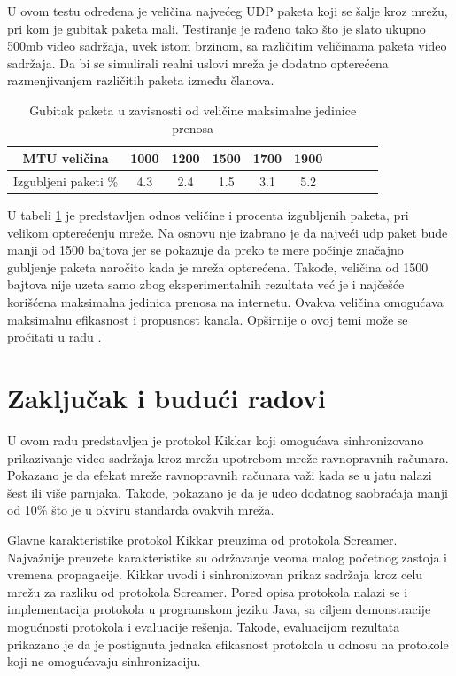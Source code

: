 \documentclass[12pt,oneside]{memoir}
\begin{document}
U ovom testu određena je veličina najvećeg UDP paketa koji se šalje kroz mrežu, pri kom je gubitak paketa mali. Testiranje je rađeno tako što je slato ukupno 500mb video sadržaja, uvek istom brzinom, sa različitim veličinama paketa video sadržaja. Da bi se simulirali realni uslovi mreža je dodatno opterećena razmenjivanjem različitih paketa između članova. 

\begin{table}[h]
\caption{Gubitak paketa u zavisnosti od veličine maksimalne jedinice prenosa} 
\label{tab:mtu}
\centering
\begin{tabular}{ |c|c|c|c|c|c|c|c|c|c| } 
\hline 
 MTU veličina & 1000 & 1200 & 1500 & 1700 & 1900\\
\hline
 Izgubljeni paketi \% & 4.3 & 2.4 & 1.5 & 3.1 & 5.2  \\
\hline
\end{tabular}
\end{table} 

U tabeli \ref{tab:mtu} je predstavljen odnos veličine i procenta izgubljenih paketa, pri velikom opterećenju mreže. Na osnovu nje izabrano je da najveći udp paket bude manji od 1500 bajtova jer se pokazuje da preko te mere počinje značajno gubljenje paketa naročito kada je mreža opterećena. Takođe, veličina od 1500 bajtova nije uzeta samo zbog eksperimentalnih rezultata već je i najčešće korišćena maksimalna jedinica prenosa na internetu. Ovakva veličina omogućava maksimalnu efikasnost i propusnost kanala. Opširnije o ovoj temi može se pročitati u radu \cite{Kodikara} .




\chapter{Zaključak i budući radovi}
\label{chp:zakljucak}

U ovom radu predstavljen je protokol Kikkar koji omogućava sinhronizovano prikazivanje video sadržaja kroz mrežu upotrebom mreže ravnopravnih računara. Pokazano je da efekat mreže ravnopravnih računara važi kada se u jatu nalazi šest ili više parnjaka. Takođe, pokazano je da je udeo dodatnog saobraćaja manji od 10\% što je u okviru standarda ovakvih mreža.
 
Glavne karakteristike protokol Kikkar preuzima od protokola Screamer. Najvažnije preuzete karakteristike su održavanje veoma malog početnog zastoja i vremena propagacije. Kikkar uvodi i sinhronizovan prikaz sadržaja kroz celu mrežu za razliku od protokola Screamer. Pored opisa protokola nalazi se i implementacija protokola u programskom jeziku Java, sa ciljem demonstracije mogućnosti protokola i evaluacije rešenja. Takođe, evaluacijom rezultata prikazano je da je postignuta jednaka efikasnost protokola u odnosu na protokole koji ne omogućavaju sinhronizaciju. 
\end{document}
